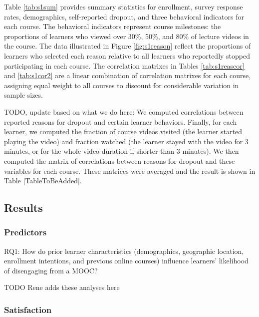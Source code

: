 \documentclass{sigchi}\usepackage[]{graphicx}\usepackage[]{color}
\begin{document}
Table \ref{tab:s1sum} provides summary statistics for enrollment, survey response rates, demographics, self-reported dropout, and three behavioral indicators for each course. The behavioral indicators represent course milestones: the proportions of learners who viewed over 30\%, 50\%, and 80\% of lecture videos in the course. The data illustrated in Figure \ref{fig:s1reason} reflect the proportions of learners who selected each reason relative to all learners who reportedly stopped participating in each course. The correlation matrixes in Tables \ref{tab:s1reascor} and \ref{tab:s1cor2} are a linear combination of correlation matrixes for each course, assigning equal weight to all courses to discount for considerable variation in sample sizes.

TODO, update based on what we do here: We computed correlations between reported reasons for dropout and certain learner behaviors. Finally, for each learner, we computed the fraction of course videos visited (the learner started playing the video) and fraction watched (the learner stayed with the video for 3 minutes, or for the whole video duration if shorter than 3 minutes). We then computed the matrix of correlations between reasons for dropout and these variables for each course. These matrices were averaged and the result is shown in Table [TableToBeAdded].


\subsection{Results}

\subsubsection{Predictors}

RQ1: How do prior learner characteristics (demographics, geographic location, enrollment intentions, and previous online courses) influence learners' likelihood of disengaging from a MOOC?

TODO Rene adds these analyses here

\subsubsection{Satisfaction}
\end{document}
